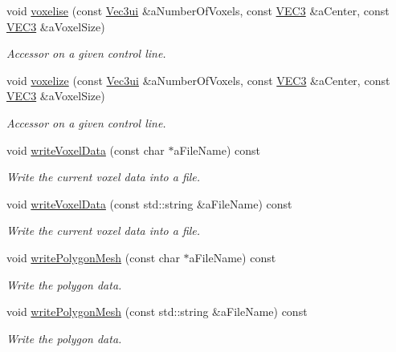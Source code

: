 \begin{DoxyCompactItemize}
void \hyperlink{class_graphics_1_1_implicit_surface_a5500f9886769b0f5792ff288580ffb98}{voxelise} (const \hyperlink{class_math_1_1_vec3}{Vec3ui} \&aNumberOfVoxels, const \hyperlink{class_math_1_1_vec3}{VEC3} \&aCenter, const \hyperlink{class_math_1_1_vec3}{VEC3} \&aVoxelSize)
\begin{DoxyCompactList}\small\item\em Accessor on a given control line. \end{DoxyCompactList}\item 
void \hyperlink{class_graphics_1_1_implicit_surface_adf3705ca0a762fac4bf9434b8a91297b}{voxelize} (const \hyperlink{class_math_1_1_vec3}{Vec3ui} \&aNumberOfVoxels, const \hyperlink{class_math_1_1_vec3}{VEC3} \&aCenter, const \hyperlink{class_math_1_1_vec3}{VEC3} \&aVoxelSize)
\begin{DoxyCompactList}\small\item\em Accessor on a given control line. \end{DoxyCompactList}\item 
void \hyperlink{class_graphics_1_1_implicit_surface_ad352331cd6ecd70ec0ea331b4e930862}{writeVoxelData} (const char $\ast$aFileName) const 
\begin{DoxyCompactList}\small\item\em Write the current voxel data into a file. \end{DoxyCompactList}\item 
void \hyperlink{class_graphics_1_1_implicit_surface_a57066add6564a1493f59aa3ef41282b7}{writeVoxelData} (const std::string \&aFileName) const 
\begin{DoxyCompactList}\small\item\em Write the current voxel data into a file. \end{DoxyCompactList}\item 
void \hyperlink{class_graphics_1_1_implicit_surface_a90b3e4378087f478d4e132b223972ba2}{writePolygonMesh} (const char $\ast$aFileName) const 
\begin{DoxyCompactList}\small\item\em Write the polygon data. \end{DoxyCompactList}\item 
void \hyperlink{class_graphics_1_1_implicit_surface_a49424bc0bff971fd3beba3d18451d4be}{writePolygonMesh} (const std::string \&aFileName) const 
\begin{DoxyCompactList}\small\item\em Write the polygon data. \end{DoxyCompactList}\item 

\end{DoxyCompactItemize}

